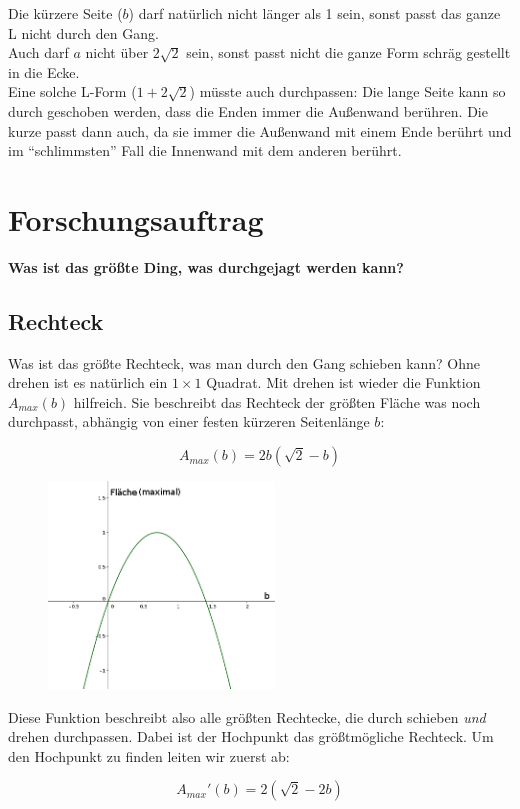 \documentclass[a4paper,11pt]{article}
\begin{document}
Die kürzere Seite ($b$) darf natürlich nicht länger als 1 sein, sonst passt das ganze L nicht durch den Gang. \\
Auch darf $a$ nicht \"uber $2\sqrt{2}$ sein, sonst passt nicht die ganze Form schräg gestellt in die Ecke. \\
Eine solche L-Form ($1+2\sqrt{2}$) müsste auch durchpassen: Die lange Seite kann so durch geschoben werden, dass die Enden immer die Außenwand berühren. Die kurze passt dann auch, da sie immer die Außenwand mit einem Ende berührt und im ``schlimmsten'' Fall die Innenwand mit dem anderen berührt.

\section{Forschungsauftrag}
\textbf{Was ist das größte Ding, was durchgejagt werden kann?}

\subsection{Rechteck}
Was ist das größte Rechteck, was man durch den Gang schieben kann? Ohne drehen ist es natürlich ein $1\times 1$ Quadrat. Mit drehen ist wieder die Funktion $A_{max}(b)$ hilfreich. Sie beschreibt das Rechteck der größten Fläche was noch durchpasst, abhängig von einer festen kürzeren Seitenlänge $b$:

\[ A_{max}(b) = 2b(\sqrt{2}-b) \]

\begin{figure}[H] 
        \centering
        \includegraphics[width=6cm]{img/FA_1.png}
\end{figure}

Diese Funktion beschreibt also alle größten Rechtecke, die durch schieben \textit{und} drehen durchpassen. Dabei ist der Hochpunkt das größtmögliche Rechteck. Um den Hochpunkt zu finden leiten wir zuerst ab:

\[ A_{max}'(b) = 2(\sqrt{2}-2b) \]
\end{document}

